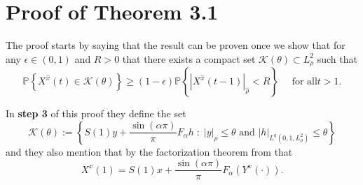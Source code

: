 \documentclass{article}
\numberwithin{equation}{section}
\begin{document}
\section{Proof of Theorem 3.1 \cite{TZ98}}
The proof starts by saying that the result can be proven once we show that for any $\epsilon \in (0,1)$ and $R>0$ that there exists a compact set $\mathscr{K}(\theta) \subset L^2_{\rho}$ such that
	\begin{equation}\label{E:3.1ineq}
		\mathbb{P}\left\{ X^{\hat x}(t) \in \mathscr{K}(\theta) \right\} \ge (1-\epsilon)\mathbb{P} \left\{ | X^{\hat x}(t-1)|_{\hat \rho} < R \right\} \quad \text{ for all} t>1.
	\end{equation}

In \textbf{step 3} of this proof they define the set
	\begin{equation}\label{E:KTheta}
		\mathscr{K}(\theta) := \left\{ S(1)y + \frac{\sin(\alpha \pi)}{\pi} F_{\alpha}h  \; : \; |y|_{\hat{\rho}} \le \theta \text{ and } |h|_{L^q(0,1,L^2_{\rho})} \le \theta\right\}
	\end{equation}
and they also mention that by the factorization theorem from \cite{DZ96} that
	\begin{equation}\label{E:Factorization}
		X^x(1) = S(1)x + \frac{\sin(\alpha \pi)}{\pi} F_{\alpha}\left( Y^x(\cdot) \right).
	\end{equation}
\end{document}
